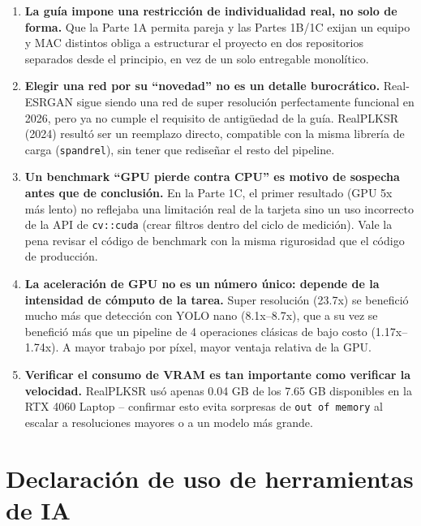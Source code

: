 \documentclass[12pt,a4paper]{article}
\begin{document}
\begin{enumerate}

\item \textbf{La guía impone una restricción de individualidad real, no solo de forma.} Que la Parte 1A permita pareja y las Partes 1B/1C exijan un equipo y MAC distintos obliga a estructurar el proyecto en dos repositorios separados desde el principio, en vez de un solo entregable monolítico.

\item \textbf{Elegir una red por su ``novedad'' no es un detalle burocrático.} Real-ESRGAN sigue siendo una red de super resolución perfectamente funcional en 2026, pero ya no cumple el requisito de antigüedad de la guía. RealPLKSR (2024) resultó ser un reemplazo directo, compatible con la misma librería de carga (\texttt{spandrel}), sin tener que rediseñar el resto del pipeline.

\item \textbf{Un benchmark ``GPU pierde contra CPU'' es motivo de sospecha antes que de conclusión.} En la Parte 1C, el primer resultado (GPU 5x más lento) no reflejaba una limitación real de la tarjeta sino un uso incorrecto de la API de \texttt{cv::cuda} (crear filtros dentro del ciclo de medición). Vale la pena revisar el código de benchmark con la misma rigurosidad que el código de producción.

\item \textbf{La aceleración de GPU no es un número único: depende de la intensidad de cómputo de la tarea.} Super resolución (23.7x) se benefició mucho más que detección con YOLO nano (8.1x--8.7x), que a su vez se benefició más que un pipeline de 4 operaciones clásicas de bajo costo (1.17x--1.74x). A mayor trabajo por píxel, mayor ventaja relativa de la GPU.

\item \textbf{Verificar el consumo de VRAM es tan importante como verificar la velocidad.} RealPLKSR usó apenas 0.04 GB de los 7.65 GB disponibles en la RTX 4060 Laptop -- confirmar esto evita sorpresas de \texttt{out of memory} al escalar a resoluciones mayores o a un modelo más grande.

\end{enumerate}

\section*{Declaración de uso de herramientas de IA}
\end{document}
